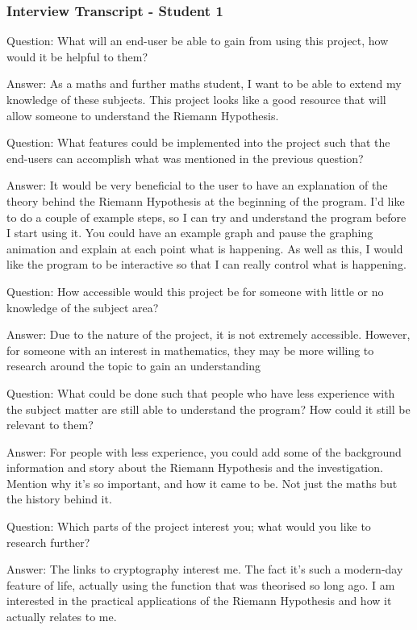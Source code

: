 \documentclass{article}
\begin{document}
\subsubsection{Interview Transcript - Student 1}
Question: What will an end-user be able to gain from using this project, how would it be helpful to them?

Answer: As a maths and further maths student, I want to be able to extend my knowledge of these subjects. This project looks like a good resource that will allow someone to understand the Riemann Hypothesis.

Question: What features could be implemented into the project such that the end-users can accomplish what was mentioned in the previous question?

Answer: It would be very beneficial to the user to have an explanation of the theory behind the Riemann Hypothesis at the beginning of the program. I'd like to do a couple of example steps, so I can try and understand the program before I start using it. You could have an example graph and pause the graphing animation and explain at each point what is happening. As well as this, I would like the program to be interactive so that I can really control what is happening.

Question: How accessible would this project be for someone with little or no knowledge of the subject area?

Answer: Due to the nature of the project, it is not extremely accessible. However, for someone with an interest in mathematics, they may be more willing to research around the topic to gain an understanding

Question: What could be done such that people who have less experience with the subject matter are still able to understand the program? How could it still be relevant to them?

Answer: For people with less experience, you could add some of the background information and story about the Riemann Hypothesis and the investigation. Mention why it's so important, and how it came to be. Not just the maths but the history behind it.

Question: Which parts of the project interest you; what would you like to research further?

Answer: The links to cryptography interest me. The fact it’s such a modern-day feature of life, actually using the function that was theorised so long ago. I am interested in the practical applications of the Riemann Hypothesis and how it actually relates to me.
\end{document}
